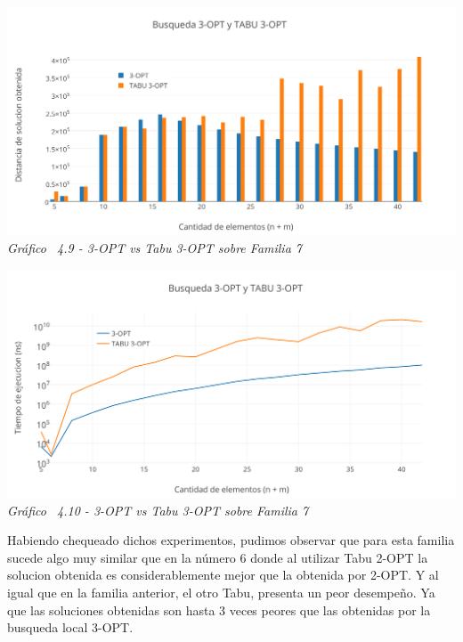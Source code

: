 \vspace*{0.3cm} \vspace*{0.3cm}
  \begin{center}
 \includegraphics[scale=0.5]{./EJ4/comparativoanillos3opt.png}\\
 {            \textit{Gráfico \ 4.9 - 3-OPT vs Tabu 3-OPT sobre Familia 7}}
  \end{center}
  \vspace*{0.3cm}

\vspace*{0.3cm} \vspace*{0.3cm}
  \begin{center}
 \includegraphics[scale=0.5]{./EJ4/medicionanillos3opt.png}\\
 {            \textit{Gráfico \ 4.10 - 3-OPT vs Tabu 3-OPT sobre Familia 7}}
  \end{center}
  \vspace*{0.3cm}
  
Habiendo chequeado dichos experimentos, pudimos observar que para esta familia sucede algo muy similar que en la n\'umero 6 donde al utilizar Tabu 2-OPT la solucion obtenida es considerablemente mejor que la obtenida por 2-OPT. 
Y al igual que en la familia anterior, el otro Tabu, presenta un peor desempeño. Ya que las soluciones obtenidas son hasta 3 veces peores que las obtenidas por la busqueda local 3-OPT.
 
